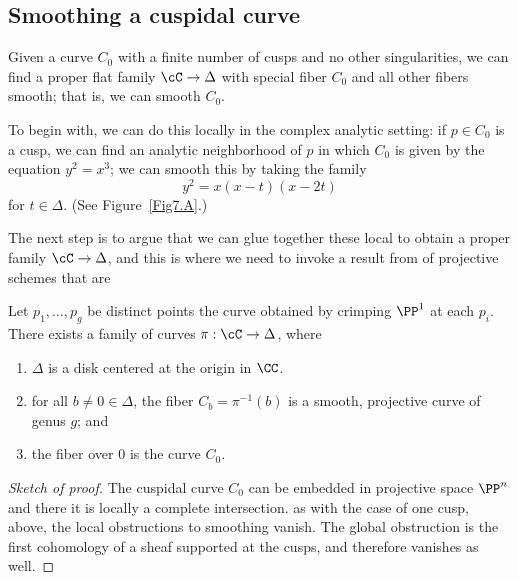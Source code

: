 \subsection*{Smoothing a cuspidal curve}
Given a curve $C_0$ with a finite number of cusps and no other
singularities, we can find a proper flat family $\cC \to \Delta$ with
special fiber $C_0$ and all other fibers smooth;
that is, we can smooth $C_0$.

To begin with, we can do this locally in the complex analytic setting:
if $p \in C_0$ is a cusp, we can find an analytic neighborhood of $p$
in which $C_0$ is given by the equation $y^2 = x^3$; we can smooth this
by taking the family
$$
y^2 = x(x-t)(x-2t)
$$
for $t\in \Delta$.
(See Figure~\ref{Fig7.A}.)

The next step is to argue that we can glue together these local 
%
to obtain a proper family $\cC \to \Delta$, and this is where we need
to invoke a result from 
%
of projective schemes that
are 
%

\begin{npt}
\begin{lemma}[{{\cite[Proposition 6.5.2]{MR2223408}}}]
\label{specialization to cuspidal curve}
Let 
$p_1,\dots,p_g$ be distinct points 
the curve
obtained by
crimping $\PP^1$ at each $p_i$. There exists a family of curves $\pi :
\cC \to \Delta$, where
\begin{enumerate}
\item $\Delta$ is a disk centered at the origin in $\CC$.
\item for all $b \neq 0 \in \Delta$, the fiber $C_b = \pi^{-1}(b)$
is a smooth, projective curve of genus $g$;  and
\item the fiber over $0$ is the curve $C_0$.
\unif
\end{enumerate}
\end{lemma}
\end{npt}

\begin{proof}[Sketch of proof]
The cuspidal curve $C_{0}$ can be embedded in projective space $\PP^{n}$
and there
it is locally a complete intersection.
as with the case of one cusp,
above, the local obstructions
to smoothing vanish. The global obstruction is the first cohomology of
a sheaf supported at the cusps,
and therefore vanishes as well.
\end{proof}

